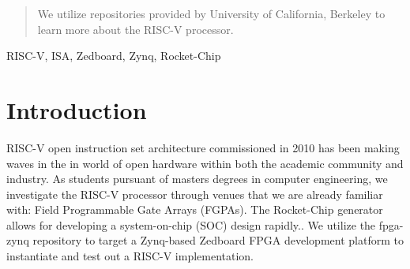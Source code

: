 \documentclass[journal]{IEEEtran}
\begin{document}


\maketitle

\begin{abstract}
We utilize repositories provided by University of California, Berkeley to learn more about the RISC-V processor. 
\end{abstract}

\begin{IEEEkeywords}
RISC-V, ISA, Zedboard, Zynq, Rocket-Chip
\end{IEEEkeywords}

%



\section{Introduction}
% 
% 
% 
% 
 RISC-V open instruction set architecture commissioned in 2010 has been making waves in the in world of open hardware within both the academic community and industry. As students pursuant of masters degrees in computer engineering, we investigate the RISC-V processor through venues that we are already familiar with: Field Programmable Gate Arrays (FGPAs).
\newline The Rocket-Chip generator allows for developing a system-on-chip (SOC) design rapidly.\cite{Asanović:EECS-2016-17}. We utilize the fpga-zynq\cite{fpga-zynq} repository to target a Zynq-based Zedboard FPGA development platform to instantiate and test out a RISC-V implementation.
\end{document}
